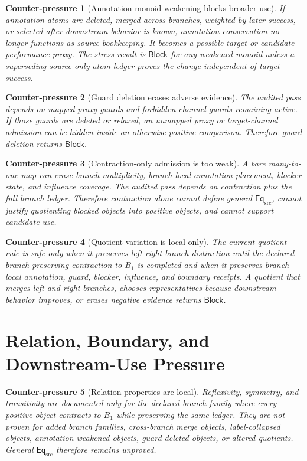 \documentclass[11pt]{article}
\newcommand{\EqSrc}{\mathsf{Eq}_{\mathrm{src}}}
\newcommand{\Block}{\mathsf{Block}}
\newtheorem{counterpressure}{Counter-pressure}
\begin{document}
\begin{counterpressure}[Annotation-monoid weakening blocks broader use]
If annotation atoms are deleted, merged across branches, weighted by
later success, or selected after downstream behavior is known, annotation
conservation no longer functions as source bookkeeping. It becomes a
possible target or candidate-performance proxy. The stress result is
\(\Block\) for any weakened monoid unless a superseding source-only atom
ledger proves the change independent of target success.
\end{counterpressure}

\begin{counterpressure}[Guard deletion erases adverse evidence]
The audited pass depends on mapped proxy guards and forbidden-channel
guards remaining active. If those guards are deleted or relaxed, an
unmapped proxy or target-channel admission can be hidden inside an
otherwise positive comparison. Therefore guard deletion returns
\(\Block\).
\end{counterpressure}

\begin{counterpressure}[Contraction-only admission is too weak]
A bare many-to-one map can erase branch multiplicity, branch-local
annotation placement, blocker state, and influence coverage. The audited
pass depends on contraction plus the full branch ledger. Therefore
contraction alone cannot define general \(\EqSrc\), cannot justify
quotienting blocked objects into positive objects, and cannot support
candidate use.
\end{counterpressure}

\begin{counterpressure}[Quotient variation is local only]
The current quotient rule is safe only when it preserves left-right
branch distinction until the declared branch-preserving contraction to
\(B_{1}\) is completed and when it preserves branch-local annotation,
guard, blocker, influence, and boundary receipts. A quotient that merges
left and right branches, chooses representatives because downstream
behavior improves, or erases negative evidence returns \(\Block\).
\end{counterpressure}

\section{Relation, Boundary, and Downstream-Use Pressure}

\begin{counterpressure}[Relation properties are local]
Reflexivity, symmetry, and transitivity are documented only for the
declared branch family where every positive object contracts to \(B_{1}\)
while preserving the same ledger. They are not proven for added branch
families, cross-branch merge objects, label-collapsed objects,
annotation-weakened objects, guard-deleted objects, or altered
quotients. General \(\EqSrc\) therefore remains unproved.
\end{counterpressure}
\end{document}
